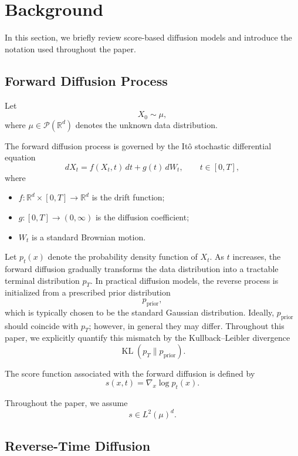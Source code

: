 \documentclass[11pt]{article}
\DeclareMathOperator{\KL}{KL}
\begin{document}
\section{Background}

In this section, we briefly review score-based diffusion models and introduce
the notation used throughout the paper.

\subsection{Forward Diffusion Process}

Let
\[
X_0\sim\mu,
\]
where $\mu\in\mathcal P(\mathbb R^d)$ denotes the unknown data
distribution.

The forward diffusion process is governed by the It\^o stochastic
differential equation
\[
dX_t
=
f(X_t,t)\,dt
+
g(t)\,dW_t,
\qquad
t\in[0,T],
\]
where

\begin{itemize}
\item
$f:\mathbb R^d\times[0,T]\rightarrow\mathbb R^d$
is the drift function;

\item
$g:[0,T]\rightarrow(0,\infty)$
is the diffusion coefficient;

\item
$W_t$
is a standard Brownian motion.
\end{itemize}

Let $p_t(x)$ denote the probability density function of $X_t$.
As $t$ increases, the forward diffusion gradually transforms the data
distribution into a tractable terminal distribution $p_T$.
In practical diffusion models, the reverse process is initialized from a
prescribed prior distribution
\[
p_{\mathrm{prior}},
\]
which is typically chosen to be the standard Gaussian distribution.
Ideally, $p_{\mathrm{prior}}$ should coincide with $p_T$; however, in
general they may differ. Throughout this paper, we explicitly quantify this
mismatch by the Kullback--Leibler divergence
\[
\KL(p_T\|p_{\mathrm{prior}}).
\]

The score function associated with the forward diffusion is defined by
\[
s(x,t)
=
\nabla_x\log p_t(x).
\]

Throughout the paper, we assume
\[
s\in L^2(\mu)^d.
\]

\subsection{Reverse-Time Diffusion}
\end{document}
